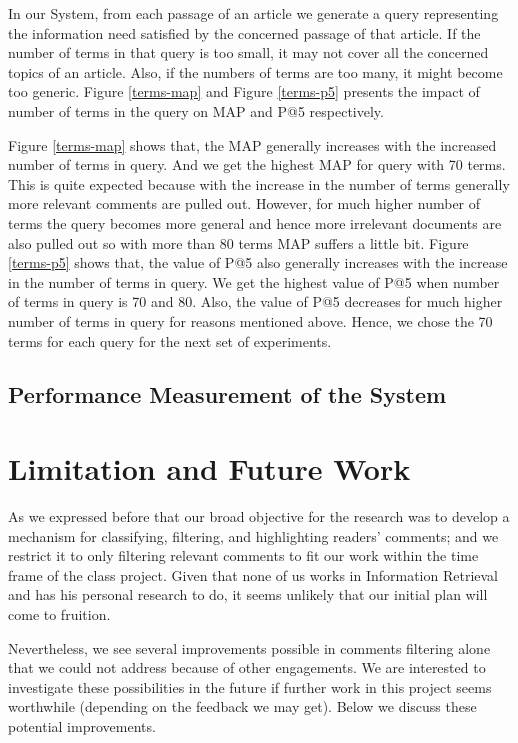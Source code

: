 \documentclass[article]{IEEEtran}
\begin{document}
In our System, from each passage of an article we generate a query representing the information need satisfied by the concerned passage of that article. If the number of terms in that query is too small, it may not cover all the concerned topics of an article. Also, if the numbers of terms are too many, it might become too generic. Figure \ref{terms-map} and Figure \ref{terms-p5} presents the impact of number of terms in the query on MAP and P@5 respectively.

Figure \ref{terms-map} shows that, the MAP generally increases with the increased number of terms in query. And we get the highest MAP for query with 70 terms. This is quite expected because with the increase in the number of terms generally more relevant comments are pulled out. However, for much higher number of terms the query becomes more general and hence more irrelevant documents are also pulled out so with more than 80 terms MAP suffers a little bit.
Figure \ref{terms-p5} shows that, the value of P@5 also generally increases with the increase in the number of terms in query. We get the highest value of P@5 when number of terms in query is 70 and 80. Also, the value of P@5 decreases for much higher number of terms in query for reasons mentioned above.  Hence, we chose the 70 terms for each query for the next set of experiments. 

\subsection{Performance Measurement of the System}




\section{Limitation and Future Work}
\label{fw}
As we expressed before that our broad objective for the research was to develop a mechanism for classifying, filtering, and highlighting readers' comments; and we restrict it to only filtering relevant comments to fit our work within the time frame of the class project. Given that none of us works in Information Retrieval and has his personal research to do, it seems unlikely that our initial plan will come to fruition.

Nevertheless, we see several improvements possible in comments filtering alone that we could not address because of other engagements. We are interested to investigate these possibilities in the future if further work in this project seems worthwhile (depending on the feedback we may get). Below we discuss these potential improvements.       
\end{document}
